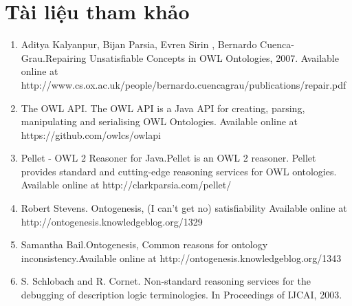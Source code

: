\chapter{Tài liệu tham khảo}
\begin{enumerate}
\item 
Aditya Kalyanpur, Bijan Parsia, Evren Sirin
, Bernardo Cuenca-Grau.Repairing Unsatisfiable Concepts in OWL Ontologies, 2007. Available online at \\ http://www.cs.ox.ac.uk/people/bernardo.cuencagrau/publications/repair.pdf
\item
The OWL API. The OWL API is a Java API for creating, parsing, manipulating and serialising OWL Ontologies. Available online at
https://github.com/owlcs/owlapi
\item
Pellet - OWL 2 Reasoner for Java.Pellet is an OWL 2 reasoner. Pellet provides standard and cutting-edge reasoning services for OWL ontologies. Available online at http://clarkparsia.com/pellet/
\item 
Robert Stevens. Ontogenesis, (I can’t get no) satisfiability Available online at http://ontogenesis.knowledgeblog.org/1329
\item
Samantha Bail.Ontogenesis, Common reasons for ontology inconsistency.Available online at http://ontogenesis.knowledgeblog.org/1343
\item 
S. Schlobach and R. Cornet. Non-standard reasoning services for the debugging of description logic terminologies. In Proceedings of IJCAI, 2003.
\end{enumerate}


